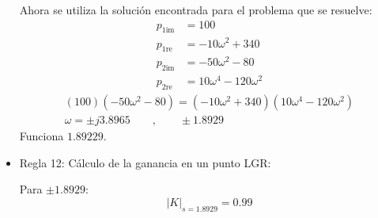 \begin{itemize}
  Ahora se utiliza la solución encontrada para el problema que se resuelve:
  \begin{align*}
    p_{1\text{im}} &=100
    \\
    p_{1\text{re}} &=-10\omega^2+340
    \\
    p_{2\text{im}} &=-50\omega^2 -80
    \\
    p_{2\text{re}} &=10\omega^4 - 120 \omega^2
  \end{align*}
  \begin{align*}
    (100)(-50\omega^2 -80) = (-10\omega^2+340)(10\omega^4 - 120 \omega^2)
    \\
    \omega = \pm j3.8965 \qquad, \qquad \pm 1.8929
  \end{align*}
  Funciona $1.89229$.

  \item Regla 12: Cálculo de la ganancia en un punto LGR:
  
  Para $\pm1.8929$:
    \begin{equation*}
    |K|_{s=1.8929} = 0.99
  \end{equation*}

\end{itemize}
